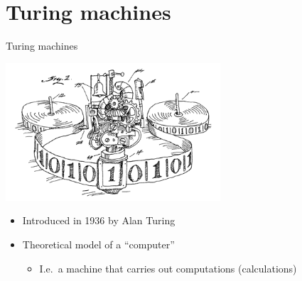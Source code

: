 \part{Turing machines}
\frame{\partpage}

\begin{frame}{Turing machines}
    \begin{center}
        \includegraphics[width=0.6\textwidth]{turing_machine}
    \end{center}
    \begin{itemize}
        \pause\item Introduced in 1936 by Alan Turing
        \pause\item Theoretical model of a ``computer''
            \begin{itemize}
                \pause\item I.e.\ a machine that carries out computations (calculations)
            \end{itemize}
    \end{itemize}
\end{frame}

